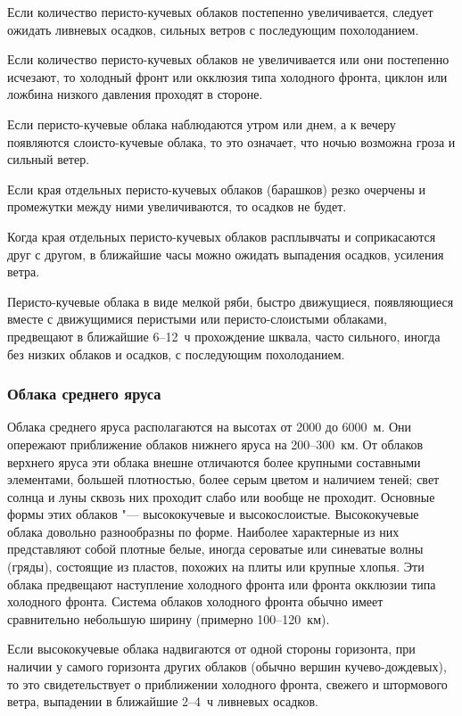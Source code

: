  Если количество перисто-кучевых облаков постепенно
увеличивается, следует ожидать ливневых осадков, сильных ветров с
последующим похолоданием.

 Если количество перисто-кучевых облаков не увеличивается или
они постепенно исчезают, то холодный фронт или окклюзия типа холодного
фронта, циклон или ложбина низкого давления проходят в стороне.

 Если перисто-кучевые облака наблюдаются утром или днем, а к вечеру
появляются слоисто-кучевые облака, то это означает, что ночью возможна
гроза и сильный ветер.

 Если края отдельных перисто-кучевых облаков (барашков) резко
очерчены и промежутки между ними увеличиваются, то осадков не будет.

 Когда края отдельных перисто-кучевых облаков расплывчаты и
соприкасаются друг с другом, в ближайшие часы можно ожидать выпадения
осадков, усиления ветра.

 Перисто-кучевые облака в виде мелкой ряби, быстро движущиеся,
появляющиеся вместе с движущимися перистыми или перисто-слоистыми
облаками, предвещают в ближайшие 6--12~ч прохождение шквала, часто
сильного, иногда без низких облаков и осадков, с последующим
похолоданием.

\subsubsection{Облака среднего яруса}

Облака среднего яруса располагаются на высотах от 2000 до 6000~м. Они
опережают приближение облаков нижнего яруса на 200--300~км. От облаков
верхнего яруса эти облака внешне отличаются более крупными составными
элементами, большей плотностью, более серым цветом и наличием теней;
свет солнца и луны сквозь них проходит слабо или вообще не
проходит. Основные формы этих облаков "--- высококучевые и
высокослоистые. Высококучевые облака довольно разнообразны по
форме. Наиболее характерные из них представляют собой плотные белые,
иногда сероватые или синеватые волны (гряды), состоящие из пластов,
похожих на плиты или крупные хлопья. Эти облака предвещают наступление
холодного фронта или фронта окклюзии типа холодного фронта. Система
облаков холодного фронта обычно имеет сравнительно небольшую ширину
(примерно 100--120~км).

 Если высококучевые облака надвигаются от одной стороны
горизонта, при наличии у самого горизонта других облаков (обычно
вершин кучево-дождевых), то это свидетельствует о приближении
холодного фронта, свежего и штормового ветра, выпадении в ближайшие
2--4~ч ливневых осадков.

